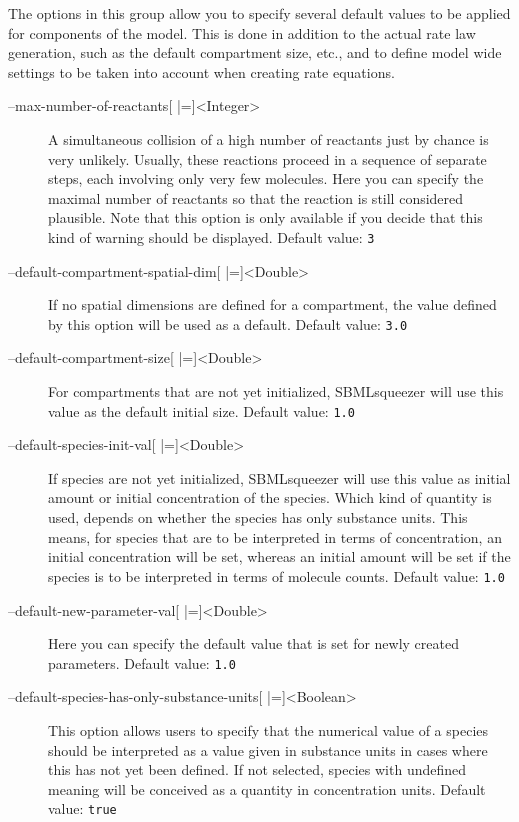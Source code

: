 The options in this group allow you to specify several default values to be
applied for components of the model.
This is done in addition to the actual rate law generation, such as the default
compartment size, etc., and to define model wide settings to be taken into
account when creating rate equations.
\begin{description}
\item[--max-number-of-reactants{[} |={]}<Integer>]
  A simultaneous collision of a high number of reactants just by
  chance is very unlikely. Usually, these reactions proceed in
  a sequence of separate steps, each involving only very few molecules.
  Here you can specify the maximal number of reactants so that
  the reaction is still considered plausible. 
  Note that this option is only available if
  you decide that this kind of warning should be displayed.
  Default value: \texttt{3}

\item[--default-compartment-spatial-dim{[} |={]}<Double>]
  If no spatial dimensions are defined for a compartment, the value
  defined by this option will be used as a default.
  Default value: \texttt{3.0}

\item[--default-compartment-size{[} |={]}<Double>]
  For compartments that are not yet initialized, SBMLsqueezer will
  use this value as the default initial size.
  Default value: \texttt{1.0}

\item[--default-species-init-val{[} |={]}<Double>]
  If species are not yet initialized, SBMLsqueezer will use this
  value as initial amount or initial concentration of the species.
  Which kind of quantity is used, depends on whether the species
  has only substance units. This means, for species that are to
  be interpreted in terms of concentration, an initial concentration
  will be set, whereas an initial amount will be set if the species
  is to be interpreted in terms of molecule counts.
  Default value: \texttt{1.0}

\item[--default-new-parameter-val{[} |={]}<Double>]
  Here you can specify the default value that is set for newly
  created parameters.
  Default value: \texttt{1.0}

\item[--default-species-has-only-substance-units{[} |={]}<Boolean>]
  This option allows users to specify that the numerical value
  of a species should be interpreted as a value given in substance
  units in cases where this has not yet been defined. If not selected,
  species with undefined meaning will be conceived as a quantity
  in concentration units.
  Default value: \texttt{true}


\end{description}
